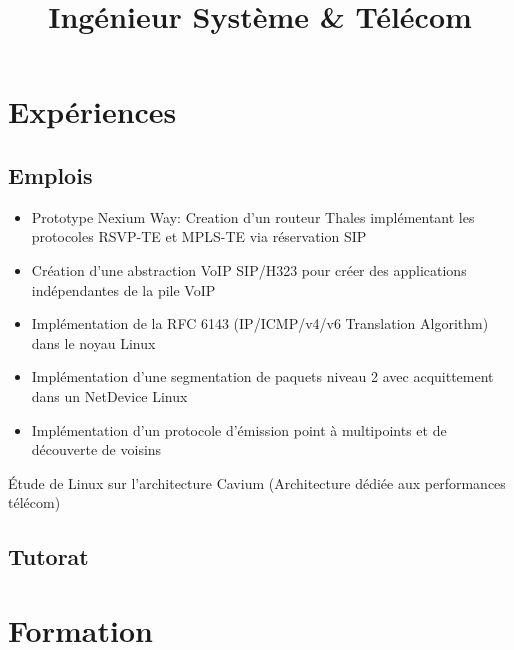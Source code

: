 \documentclass[11pt,a4paper]{moderncv}
\title{\Large{Ingénieur Système \& Télécom}}
\begin{document}
\maketitle

\section{Expériences}
\subsection{Emplois}
{
  \begin{itemize}
    \renewcommand{\labelitemi}{$\bullet$  }
    \item Prototype Nexium Way: Creation d'un routeur Thales implémentant les protocoles RSVP-TE et MPLS-TE via réservation SIP
    \item Création d'une abstraction VoIP SIP/H323 pour créer des applications indépendantes de la pile VoIP
    \item Implémentation de la RFC 6143 (IP/ICMP/v4/v6 Translation Algorithm) dans le noyau Linux
    \item Implémentation d'une segmentation de paquets niveau 2 avec acquittement dans un NetDevice Linux
    \item Implémentation d'un protocole d'émission point \`a multipoints et de découverte de voisins
  \end{itemize}
}					%
{
  Étude de Linux sur l'architecture Cavium (Architecture dédiée aux performances télécom)
}					%
\subsection{Tutorat}

\section{Formation}
\end{document}

